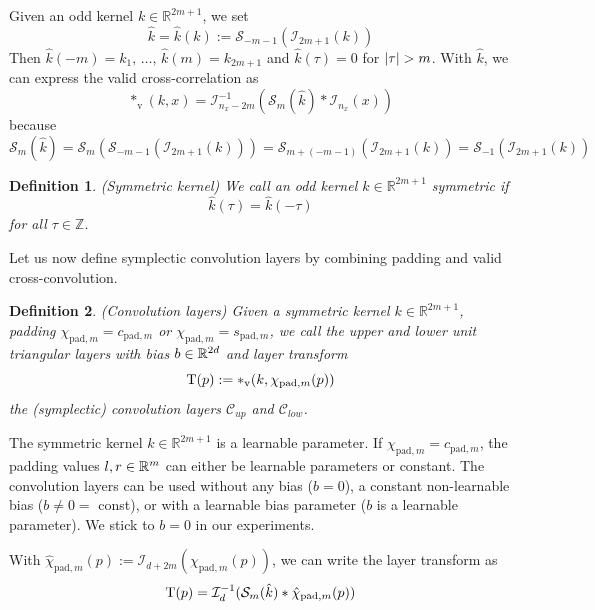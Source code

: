 \documentclass[twoside,a4paper]{article}
\newtheorem{definition}{Definition}
\begin{document}
Given an odd kernel $k \in \mathbb{R}^{2m+1}$, we set
\begin{equation*}
	\hat{k} = \hat{k}(k) := \mathcal{S}_{-m-1}(\mathcal{I}_{2m+1}(k))
\end{equation*}
Then $\hat{k}(-m) = k_1, \, \dots,\, \hat{k}(m) = k_{2m+1}$ and
$\hat{k}(\tau)=0$ for $\left|{\tau}\right| > m$. With $\hat{k}$, we can express the valid cross-correlation as
\begin{equation*}
	*_{\text{v}}(k,x) = \mathcal{I}_{n_x-2m}^{-1} (
		\mathcal{S}_{m}(\hat{k}) * \mathcal{I}_{n_x}(x)
	)
\end{equation*}
because
\begin{equation*}
	\mathcal{S}_{m}(\hat{k}) 
	= \mathcal{S}_{m}(\mathcal{S}_{-m-1}(\mathcal{I}_{2m+1}(k)))
	= \mathcal{S}_{m+(-m-1)}(\mathcal{I}_{2m+1}(k))
	= \mathcal{S}_{-1}(\mathcal{I}_{2m+1}(k))
\end{equation*}

\begin{definition}
	(Symmetric kernel)
	We call an odd kernel $k \in \mathbb{R}^{2m+1}$ symmetric if
	\begin{equation*}
		\hat{k}(\tau) = \hat{k}(-\tau)
	\end{equation*}
	for all $\tau \in \mathbb{Z}$.
\end{definition}

Let us now define symplectic convolution layers by combining padding and valid 
cross-convolution.
\begin{definition}\label{def_conv_layer}
	(Convolution layers)
	Given a symmetric kernel $k \in \mathbb{R}^{2m+1}$, padding
	$\chi_{\text{pad},m} = c_{\text{pad},m}$ or $\chi_{\text{pad},m} = s_{\text{pad},m}$,
	we call the upper and lower unit triangular layers with bias $b \in \mathbb{R}^{2d}$ and layer transform
	\begin{equation*}
		\mathrm{T}(p) := *_{\text{v}}(k,\chi_{\text{pad},m}(p))
	\end{equation*}
	the (symplectic) convolution layers $\mathcal{C}_{up}$ and $\mathcal{C}_{low}$.
\end{definition}
The symmetric kernel $k \in \mathbb{R}^{2m+1}$ is a learnable parameter.
If $\chi_{\text{pad},m} = c_{\text{pad},m}$, the padding values $l,r \in \mathbb{R}^m$ can either
be learnable parameters or constant. The convolution layers can be used without any bias ($b=0$), a
constant non-learnable bias ($b \neq 0 =$ const), or with a learnable bias parameter 
($b$ is a learnable parameter). We stick to $b=0$ in our experiments.

With $\hat{\chi}_{\text{pad},m}(p) := \mathcal{I}_{d+2m}(\chi_{\text{pad},m}(p))$,
we can write the layer transform as
\begin{equation}\label{eq_conv_layer_transform}
	\mathrm{T}(p) =
	\mathcal{I}_{d}^{-1} (
		\mathcal{S}_{m}(\hat{k}) * \hat{\chi}_{\text{pad},m}(p)
	)
\end{equation}
\end{document}
